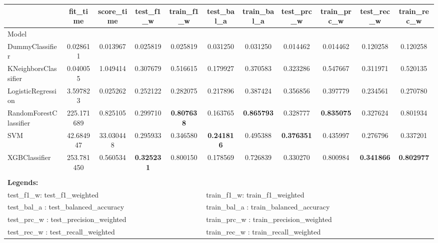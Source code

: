 \begin{tabular}{lcccccccccc}
\toprule
& fit\_time & score\_time & test\_f1\_w & train\_f1\_w & test\_bal\_a & train\_bal\_a & test\_prc\_w & train\_prc\_w & test\_rec\_w & train\_rec\_w \\ 
\midrule
Model &  &  &  &  &  &  &  &  &  &  \\ 
DummyClassifier & 0.028611 & 0.013967 & 0.025819 & 0.025819 & 0.031250 & 0.031250 & 0.014462 & 0.014462 & 0.120258 & 0.120258 \\ 
KNeighborsClassifier & 0.040055 & 1.049414 & 0.307679 & 0.516615 & 0.179927 & 0.370583 & 0.323286 & 0.547667 & 0.311971 & 0.520135 \\ 
\rowcolor{lightgray} LogisticRegression & 3.597823 & 0.025262 & 0.252122 & 0.282075 & 0.217896 & 0.387424 & 0.356856 & 0.397779 & 0.234561 & 0.270780 \\ 
RandomForestClassifier & 225.171689 & 0.825105 & 0.299710 & \textbf{0.807638} & 0.163765 & \textbf{0.865793} & 0.328777 & \textbf{0.835075} & 0.327624 & 0.801934 \\ 
SVM & 42.684947 & 33.030448 & 0.295933 & 0.346580 & \textbf{0.241816} & 0.495388 & \textbf{0.376351} & 0.435997 & 0.276796 & 0.337201 \\ 
XGBClassifier & 253.781450 & 0.560534 & \textbf{0.325231} & 0.800150 & 0.178569 & 0.726839 & 0.330270 & 0.800984 & \textbf{0.341866} & \textbf{0.802977} \\ 
\bottomrule
{} \\
\multicolumn{10}{l}{\textbf{Legends:}}   \\ \midrule
\multicolumn{5}{l}{test\_f1\_w: test\_f1\_weighted} & \multicolumn{5}{l}{train\_f1\_w: train\_f1\_weighted} \\
\multicolumn{5}{l}{test\_bal\_a : test\_balanced\_accuracy } & \multicolumn{5}{l}{train\_bal\_a : train\_balanced\_accuracy } \\
\multicolumn{5}{l}{test\_prc\_w : test\_precision\_weighted } & \multicolumn{5}{l}{train\_prc\_w : train\_precision\_weighted } \\
\multicolumn{5}{l}{test\_rec\_w : test\_recall\_weighted} & \multicolumn{5}{l}{train\_rec\_w : train\_recall\_weighted} \\
\end{tabular}
